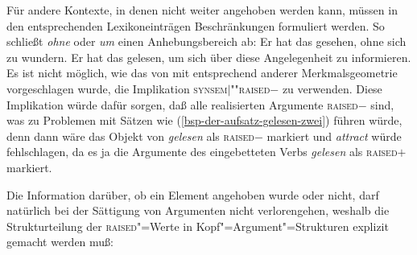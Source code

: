 {Für andere Kontexte, in denen nicht weiter angehoben werden kann, müssen in den entsprechenden
Lexikoneinträgen Beschränkungen formuliert werden. So schließt \zb \emph{ohne} oder \emph{um}
einen Anhebungsbereich ab:
\eal
\ex Er hat das gesehen, ohne sich zu wundern.
\ex Er hat das gelesen, um sich über diese Angelegenheit zu informieren.
\zl
Es ist nicht möglich, wie das von \citet[, Fußnote~54]{MdK2001a} mit entsprechend
anderer Merkmalsgeometrie vorgeschlagen wurde, die Implikation  \impl \textsc{synsem$|$""raised}$-$
zu verwenden. Diese Implikation würde dafür sorgen, daß alle realisierten Argumente \textsc{raised}$-$
sind, was zu Problemen mit Sätzen wie (\ref{bsp-der-aufsatz-gelesen-zwei}) führen würde, denn dann
wäre das Objekt von \emph{gelesen} als \textsc{raised}$-$ markiert und \emph{attract} würde
fehlschlagen, da es ja die Argumente des eingebetteten Verbs \emph{gelesen} als \textsc{raised}$+$
markiert.

Die Information darüber, ob ein Element angehoben wurde oder nicht, darf natürlich
bei der Sättigung von Argumenten nicht verlorengehen, weshalb die Strukturteilung
der \textsc{raised}"=Werte in Kopf"=Argument"=Strukturen explizit gemacht werden muß:
\begin{samepage}
\begin{schema}
\label{schema-bin-mark-final}
 \impl\\
\end{schema}
\end{samepage}


}
